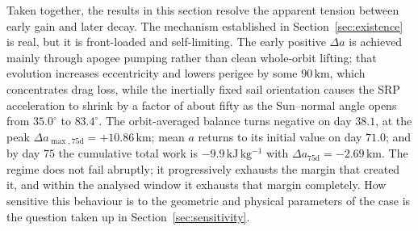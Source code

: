 \vspace{5pt}
\par\noindent Taken together, the results in this section resolve the apparent tension between early gain and later decay. The mechanism established in Section~\ref{sec:existence} is real, but it is front-loaded and self-limiting. The early positive \(\Delta a\) is achieved mainly through apogee pumping rather than clean whole-orbit lifting; that evolution increases eccentricity and lowers perigee by some \(90\,\mathrm{km}\), which concentrates drag loss, while the inertially fixed sail orientation causes the SRP acceleration to shrink by a factor of about fifty as the Sun--normal angle opens from \(35.0^\circ\) to \(83.4^\circ\). The orbit-averaged balance turns negative on day \(38.1\), at the peak \(\Delta a_{\max,75\mathrm{d}} = +10.86\,\mathrm{km}\); mean \(a\) returns to its initial value on day \(71.0\); and by day \(75\) the cumulative total work is \(-9.9\,\mathrm{kJ\,kg^{-1}}\) with \(\Delta a_{75\mathrm{d}} = -2.69\,\mathrm{km}\). The regime does not fail abruptly; it progressively exhausts the margin that created it, and within the analysed window it exhausts that margin completely. How sensitive this behaviour is to the geometric and physical parameters of the case is the question taken up in Section~\ref{sec:sensitivity}.

\FloatBarrier
